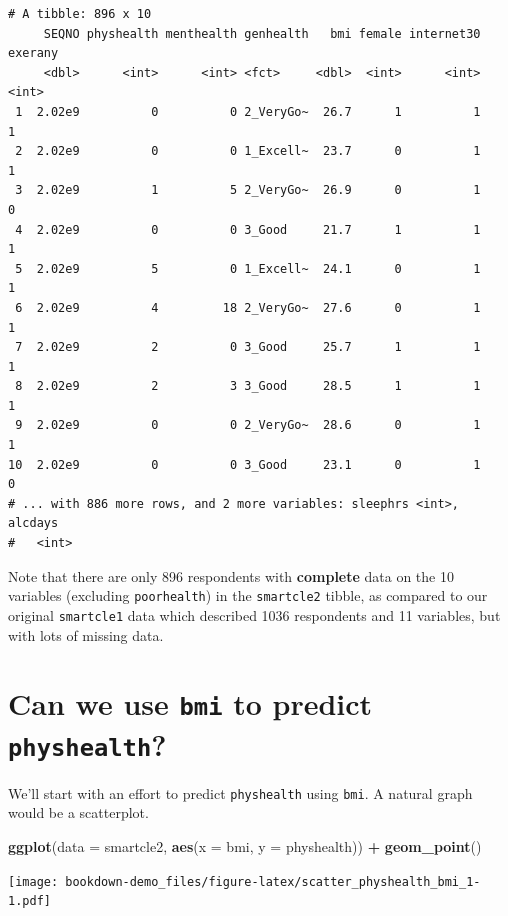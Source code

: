 \documentclass[]{book}
\newenvironment{Shaded}{\begin{snugshade}}{\end{snugshade}}
\newcommand{\KeywordTok}[1]{\textcolor[rgb]{0.13,0.29,0.53}{\textbf{#1}}}
\newcommand{\DataTypeTok}[1]{\textcolor[rgb]{0.13,0.29,0.53}{#1}}
\newcommand{\StringTok}[1]{\textcolor[rgb]{0.31,0.60,0.02}{#1}}
\newcommand{\OperatorTok}[1]{\textcolor[rgb]{0.81,0.36,0.00}{\textbf{#1}}}
\newcommand{\NormalTok}[1]{#1}
\theoremstyle{definition}
\theoremstyle{definition}
\theoremstyle{definition}
\theoremstyle{remark}
\begin{document}
\begin{verbatim}
# A tibble: 896 x 10
     SEQNO physhealth menthealth genhealth   bmi female internet30 exerany
     <dbl>      <int>      <int> <fct>     <dbl>  <int>      <int>   <int>
 1  2.02e9          0          0 2_VeryGo~  26.7      1          1       1
 2  2.02e9          0          0 1_Excell~  23.7      0          1       1
 3  2.02e9          1          5 2_VeryGo~  26.9      0          1       0
 4  2.02e9          0          0 3_Good     21.7      1          1       1
 5  2.02e9          5          0 1_Excell~  24.1      0          1       1
 6  2.02e9          4         18 2_VeryGo~  27.6      0          1       1
 7  2.02e9          2          0 3_Good     25.7      1          1       1
 8  2.02e9          2          3 3_Good     28.5      1          1       1
 9  2.02e9          0          0 2_VeryGo~  28.6      0          1       1
10  2.02e9          0          0 3_Good     23.1      0          1       0
# ... with 886 more rows, and 2 more variables: sleephrs <int>, alcdays
#   <int>
\end{verbatim}

Note that there are only 896 respondents with \textbf{complete} data on
the 10 variables (excluding \texttt{poorhealth}) in the
\texttt{smartcle2} tibble, as compared to our original
\texttt{smartcle1} data which described 1036 respondents and 11
variables, but with lots of missing data.

\section{\texorpdfstring{Can we use \texttt{bmi} to predict
\texttt{physhealth}?}{Can we use bmi to predict physhealth?}}\label{can-we-use-bmi-to-predict-physhealth}

We'll start with an effort to predict \texttt{physhealth} using
\texttt{bmi}. A natural graph would be a scatterplot.

\begin{Shaded}
\begin{Highlighting}[]
\KeywordTok{ggplot}\NormalTok{(}\DataTypeTok{data =}\NormalTok{ smartcle2, }\KeywordTok{aes}\NormalTok{(}\DataTypeTok{x =}\NormalTok{ bmi, }\DataTypeTok{y =}\NormalTok{ physhealth)) }\OperatorTok{+}
\StringTok{    }\KeywordTok{geom_point}\NormalTok{()}
\end{Highlighting}
\end{Shaded}

\texttt{[image: bookdown-demo\_files/figure-latex/scatter\_physhealth\_bmi\_1-1.pdf]}
\end{document}
